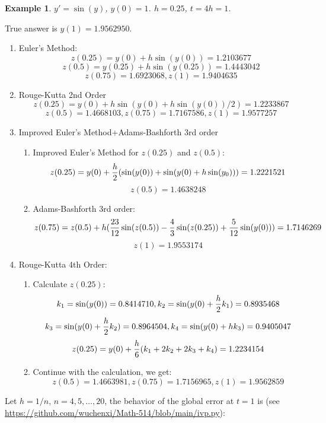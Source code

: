 \documentclass[20pt]{article} %
\theoremstyle{break}
\newtheorem{exa}[definition]{Example}
\begin{document}
\begin{exa}$y'=\sin(y)$, $y(0)=1$. $h=0.25$, $t=4h=1$.\end{exa}
True answer is $y(1)=1.9562950$.
\begin{enumerate}
\item Euler's Method:
  \[z(0.25)=y(0)+h\sin(y(0))=1.2103677\]
  \[z(0.5)=y(0.25)+h\sin(y(0.25))=1.4443042\]
  \[z(0.75)=1.6923068, z(1)=1.9404635\]
\item Rouge-Kutta 2nd Order
  \[z(0.25)=y(0)+h\sin(y(0)+h\sin(y(0))/2)=1.2233867\]
  \[z(0.5)=1.4668103, z(0.75)=1.7167586, z(1)=1.9577257\]

\newpage
\item Improved Euler's Method+Adams-Bashforth 3rd order
  \begin{enumerate}
  \item Improved Euler's Method for $z(0.25)$ and $z(0.5)$:
    \[z(0.25)=y(0)+{h\over 2}(\sin(y(0))+\sin(y(0)+h\sin(y_0)))=1.2221521\]
    \[z(0.5)=1.4638248\]
  \item Adams-Bashforth 3rd order:
    \[z(0.75)=z(0.5)+h({23\over 12}\sin(z(0.5))-{4\over 3}\sin(z(0.25))+{5\over 12}\sin(y(0)))=1.7146269\]
    \[z(1)=1.9553174\]
  \end{enumerate}
  \newpage
  \item Rouge-Kutta 4th Order:
    \begin{enumerate}
    \item Calculate $z(0.25)$:
      \[k_1=\sin(y(0))=0.8414710, k_2=\sin(y(0)+{h\over 2}k_1)=0.8935468\]
      \[k_3=\sin(y(0)+{h\over 2}k_2)=0.8964504, k_4=\sin(y(0)+hk_3)=0.9405047\]
      \[z(0.25)=y(0)+{h\over 6}(k_1+2k_2+2k_3+k_4)=1.2234154\]
    \item Continue with the calculation, we get:
      \[z(0.5)=1.4663981, z(0.75)=1.7156965, z(1)=1.9562859\]
     \end{enumerate}
\end{enumerate}

\newpage

Let $h=1/n$, $n=4, 5, \dots, 20$, the behavior of the global error at $t=1$ is (see \url{https://github.com/wuchenxi/Math-514/blob/main/ivp.py}):\\
\end{document}
